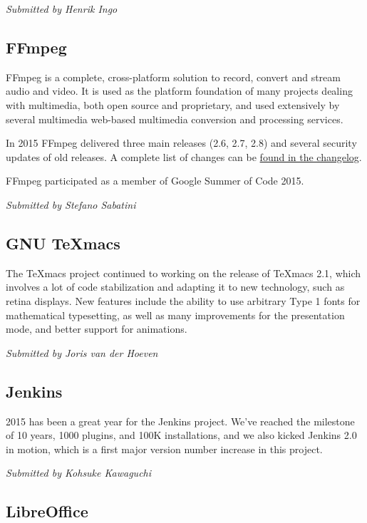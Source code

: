 \documentclass[letterpaper]{report}
\begin{document}
{\em Submitted by Henrik Ingo}

\subsection{FFmpeg}

FFmpeg is a complete, cross-platform solution to record, convert and
stream audio and video. It is used as the platform foundation of many
projects dealing with multimedia, both open source and proprietary, and
used extensively by several multimedia web-based multimedia conversion and
processing services.

In 2015 FFmpeg delivered three main releases (2.6, 2.7, 2.8) and several
security updates of old releases. A complete list of changes can be
\href{http://git.videolan.org/?p=ffmpeg.git;a=blob_plain;f=Changelog;hb=HEAD}{found
in the changelog}.

FFmpeg participated as a member of Google Summer of Code 2015.

{\em Submitted by Stefano Sabatini}

\subsection{GNU TeXmacs}

The TeXmacs project continued to working on the release of TeXmacs 2.1,
which involves a lot of code stabilization and adapting it to new
technology, such as retina displays.  New features include the ability to
use arbitrary Type 1 fonts for mathematical typesetting, as well as many
improvements for the presentation mode, and better support for animations.

{\em Submitted by Joris van der Hoeven}

\subsection{Jenkins}

2015 has been a great year for the Jenkins project. We've reached the
milestone of 10 years, 1000 plugins, and 100K installations, and we also
kicked Jenkins 2.0 in motion, which is a first major version number
increase in this project.

{\em Submitted by Kohsuke Kawaguchi}

\subsection{LibreOffice}
\end{document}
